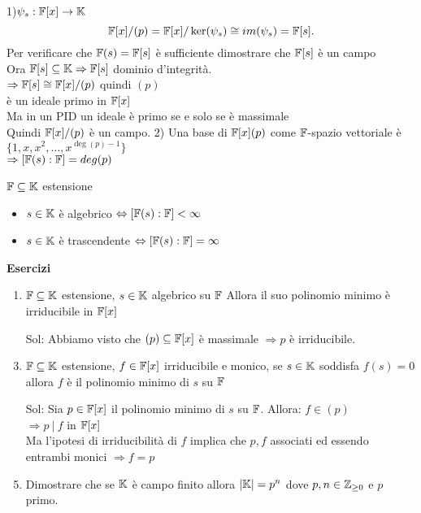 \documentclass[12px]{article}
\begin{document}
	 \begin{dimo}
		 1)$\psi_s: \mathbb{F}[x] \rightarrow \mathbb{K}$\\
		  \[
			  \mathbb{F}[x]/(p) = \mathbb{F}[x]/\ker(\psi_s)\cong im(\psi_s) = \mathbb{F}[s]
		 .\] 
		 Per verificare che $\mathbb{F}(s) = \mathbb{F}[s]$ è sufficiente dimostrare che  $\mathbb{F}[s]$ è un campo\\
		 Ora $\mathbb{F}[s]\subseteq \mathbb{K} \Rightarrow \mathbb{F}[s]$  dominio d'integrità.\\
		 $ \Rightarrow  \mathbb{F}[s]\cong \mathbb{F}[x]/(p)$ quindi $(p)$\\
		 è un ideale primo in  $\mathbb{F}[x]$\\
		 Ma in un PID un ideale è primo se e solo se è massimale\\
		 Quindi  $\mathbb{F}[x]/(p)$ è un campo.
		 2) Una base di $\mathbb{F}[x](p)$ come  $\mathbb{F}$-spazio vettoriale è $\{1,x,x^2,\ldots,x^{\deg(p)-1}\}$\\
		 $ \Rightarrow [\mathbb{F}(s):\mathbb{F}] = deg(p)$
	 \end{dimo}
	 \begin{coro}
	 	$\mathbb{F}\subseteq\mathbb{K}$ estensione
		\begin{itemize}
			\item $s\in\mathbb{K}$ è algebrico $ \Leftrightarrow[\mathbb{F}(s):\mathbb{F}]<\infty$
			\item $s\in\mathbb{K}$ è trascendente  $ \Leftrightarrow[\mathbb{F}(s):\mathbb{F}] =\infty$
		\end{itemize}
	 \end{coro}
\textbf{Esercizi}
\begin{enumerate}
	\item $\mathbb{F}\subseteq\mathbb{K}$ estensione,  $s\in\mathbb{K}$ algebrico su $\mathbb{F}$ Allora il suo polinomio minimo è irriducibile in  $\mathbb{F}[x]$
	\item[Sol:] Abbiamo visto che $(p)\subseteq\mathbb{F}[x]$ è massimale $ \Rightarrow  p $ è irriducibile.
	\item $\mathbb{F}\subseteq\mathbb{K}$ estensione, $f\in\mathbb{F}[x]$ irriducibile e monico, se $s\in\mathbb{K}$ soddisfa $f(s) = 0$ allora  $f$ è il polinomio minimo di $s$ su $\mathbb{F}$
	\item[Sol:] Sia  $p\in\mathbb{F}[x]$ il polinomio minimo di  $s$ su $\mathbb{F}$. Allora:  $f\in(p)$\\
		$ \Rightarrow p\ | \ f$ in $\mathbb{F}[x]$\\
		Ma l'ipotesi di irriducibilità di  $f$ implica che $p,f$ associati ed essendo entrambi monici $ \Rightarrow  f = p$ 
	\item Dimostrare che se $\mathbb{K}$ è campo finito allora  $|\mathbb{K}| = p^n$ dove  $p,n\in\mathbb{Z}_{\geq 0}$ e $p$ primo.

\end{enumerate}
\end{document}
